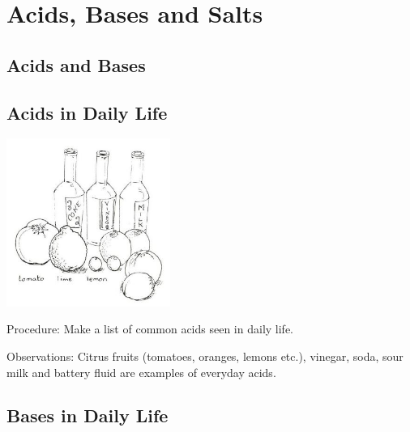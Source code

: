 \section{Acids, Bases and Salts} 

\begin{multicols}{2}


\section*{Acids and Bases} 


\subsection{Acids in Daily Life}

\begin{center}
\includegraphics[width=0.4\textwidth]{./img/source/acids-daily.jpg}
\end{center}

\begin{description*}
\item[Procedure:]{Make a list of common acids seen in daily life.}
\item[Observations:]{Citrus fruits (tomatoes, oranges, lemons etc.), vinegar, soda, sour milk and battery fluid are examples of everyday acids.}
\end{description*}

\subsection{Bases in Daily Life}


\end{multicols}
